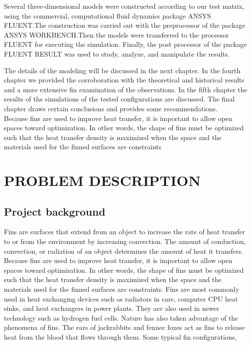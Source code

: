   Several three-dimensional models were constructed according to our test
  matrix, using the commercial, computational fluid dynamics package ANSYS FLUENT.The construction was carried out with the preprocessor of the package ANSYS WORKBENCH.Then the models were transferred to the processor FLUENT for executing the simulation. Finally, the post processor of the package FLUENT RESULT was used to study, analyze, and manipulate the results.
  
  The details of the modeling will be discussed in the next chapter. In the fourth chapter we provided the corroboration with the theoretical and historical results and a more extensive fin examination of the observations. In the fifth chapter the results of the simulations of the tested configurations are discussed. The final chapter draws certain conclusions and provides some recommendations.
\\  
  Because fins are used to improve heat transfer, it is important to allow open spaces toward optimization. In other words, the shape of fins must be optimized such that the heat transfer density is maximized when the space and the materials used for the finned surfaces are constraints






\chapter{PROBLEM DESCRIPTION}

\section{Project background}
Fins are surfaces that extend from an object to increase the rate of heat transfer to or from the environment by increasing convection. The amount of conduction, convection, or radiation of an object determines the amount of heat it transfers. Because fins are used to improve heat transfer, it is important to allow open spaces toward optimization. In other words, the shape of fins must be optimized such that the heat transfer density is maximized when the space and the materials used for the finned surfaces are constraints. Fins are most commonly used in heat exchanging devices such as radiators in cars, computer CPU heat sinks, and heat exchangers in power plants. They are also used in newer technology such as hydrogen fuel cells. Nature has also taken advantage of the phenomena of fins. The ears of jackrabbits and fennec foxes act as fins to release heat from the blood that flows through them.
Some typical fin configurations,

